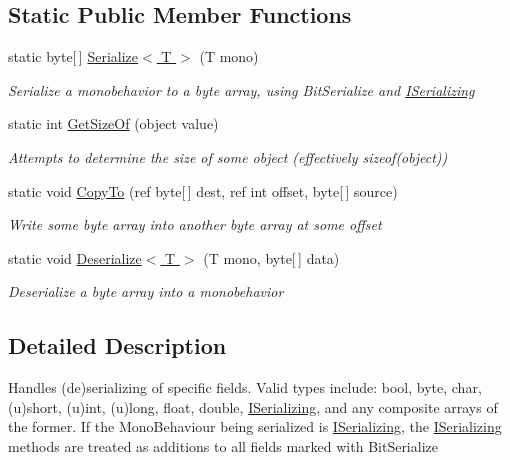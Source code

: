 \subsection*{Static Public Member Functions}
\begin{DoxyCompactItemize}
\item 
static byte\mbox{[}$\,$\mbox{]} \hyperlink{class_bit_serialize_attribute_a0d934db4b1bdd25dbb3ef5ba6536f6c3}{Serialize$<$ T $>$} (T mono)
\begin{DoxyCompactList}\small\item\em Serialize a monobehavior to a byte array, using Bit\-Serialize and \hyperlink{interface_i_serializing}{I\-Serializing} \end{DoxyCompactList}\item 
static int \hyperlink{class_bit_serialize_attribute_a45dcbeb6ab33c11f4d6cc4971bb4ba55}{Get\-Size\-Of} (object value)
\begin{DoxyCompactList}\small\item\em Attempts to determine the size of some object (effectively sizeof(object)) \end{DoxyCompactList}\item 
static void \hyperlink{class_bit_serialize_attribute_aca1cc7a1f81cfffcf0ae04058d2da2c9}{Copy\-To} (ref byte\mbox{[}$\,$\mbox{]} dest, ref int offset, byte\mbox{[}$\,$\mbox{]} source)
\begin{DoxyCompactList}\small\item\em Write some byte array into another byte array at some offset \end{DoxyCompactList}\item 
static void \hyperlink{class_bit_serialize_attribute_ae92d448c6f7bf6ffab890747e1737c65}{Deserialize$<$ T $>$} (T mono, byte\mbox{[}$\,$\mbox{]} data)
\begin{DoxyCompactList}\small\item\em Deserialize a byte array into a monobehavior \end{DoxyCompactList}\end{DoxyCompactItemize}


\subsection{Detailed Description}
Handles (de)serializing of specific fields. Valid types include\-: bool, byte, char, (u)short, (u)int, (u)long, float, double, \hyperlink{interface_i_serializing}{I\-Serializing}, and any composite arrays of the former. If the Mono\-Behaviour being serialized is \hyperlink{interface_i_serializing}{I\-Serializing}, the \hyperlink{interface_i_serializing}{I\-Serializing} methods are treated as additions to all fields marked with Bit\-Serialize 



